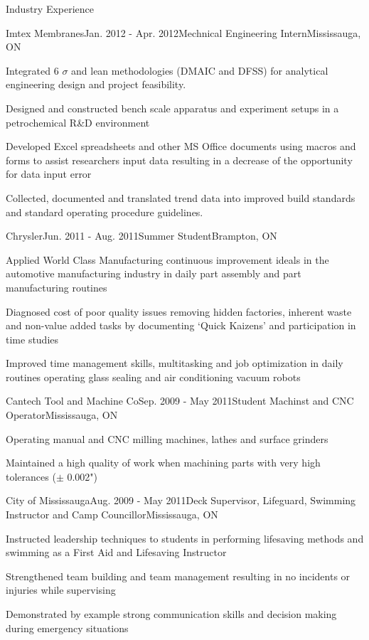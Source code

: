 \documentclass{resume} %
\begin{document}
\begin{rSection}{Industry Experience}
\begin{rSubsection}{Imtex Membranes}{Jan. 2012 - Apr. 2012}{Mechnical Engineering Intern}{Mississauga, ON}
\item Integrated 6 $\sigma$ and lean methodologies (DMAIC and DFSS) for analytical engineering design and project feasibility.
\item Designed and constructed bench scale apparatus and experiment setups in a petrochemical R\&D environment
\item Developed Excel spreadsheets and other MS Office documents using macros and forms to assist researchers input data resulting in a decrease of the opportunity for data input error
\item Collected, documented and translated trend data into improved build standards and standard operating procedure guidelines.
\end{rSubsection}

\begin{rSubsection}{Chrysler}{Jun. 2011 - Aug. 2011}{Summer Student}{Brampton, ON}

\item Applied World Class Manufacturing continuous improvement ideals in the automotive manufacturing industry in daily part assembly and part manufacturing routines
\item Diagnosed cost of poor quality issues removing hidden factories, inherent waste and non-value added tasks by documenting ‘Quick Kaizens’ and participation in time studies
\item Improved time management skills, multitasking and job optimization in daily routines operating glass sealing and air conditioning vacuum robots
\end{rSubsection}

\begin{rSubsection}{Cantech Tool and Machine Co}{Sep. 2009 - May 2011}{Student Machinst and CNC Operator}{Mississauga, ON}
\item Operating manual and CNC milling machines, lathes and surface grinders
\item Maintained a high quality of work when machining parts with very high tolerances ($\pm$ 0.002")
\end{rSubsection}

\begin{rSubsection}{City of Mississauga}{Aug. 2009 - May 2011}{Deck Supervisor, Lifeguard, Swimming Instructor and Camp Councillor}{Mississauga, ON}
\item Instructed leadership techniques to students in performing lifesaving methods and swimming as a First Aid and Lifesaving Instructor
\item Strengthened team building and team management resulting in no incidents or injuries while supervising
\item Demonstrated by example strong communication skills and decision making during emergency situations
\end{rSubsection}


\end{rSection}
\end{document}
